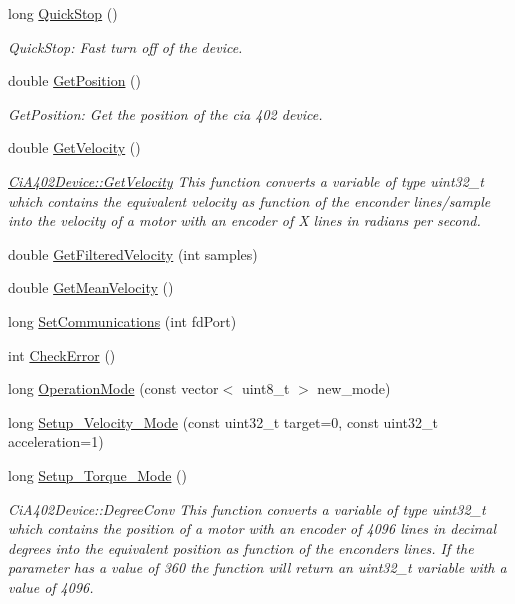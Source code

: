 \begin{DoxyCompactItemize}
long \hyperlink{classCiA402Device_a8573afbf420c29aa86cd215d74f4e4e3}{Quick\+Stop} ()
\begin{DoxyCompactList}\small\item\em Quick\+Stop\+: Fast turn off of the device. \end{DoxyCompactList}\item 
double \hyperlink{classCiA402Device_ac8d9e36e6f457565cac7d26d91e4a712}{Get\+Position} ()
\begin{DoxyCompactList}\small\item\em Get\+Position\+: Get the position of the cia 402 device. \end{DoxyCompactList}\item 
double \hyperlink{classCiA402Device_a54b43f6429da4c6c0241653355e81d36}{Get\+Velocity} ()
\begin{DoxyCompactList}\small\item\em \hyperlink{classCiA402Device_a54b43f6429da4c6c0241653355e81d36}{Ci\+A402\+Device\+::\+Get\+Velocity} This function converts a variable of type uint32\+\_\+t which contains the equivalent velocity as function of the enconder lines/sample into the velocity of a motor with an encoder of X lines in radians per second. \end{DoxyCompactList}\item 
double \hyperlink{classCiA402Device_a436b9e3ba2d14367f0bba8d0fe977e23}{Get\+Filtered\+Velocity} (int samples)
\item 
double \hyperlink{classCiA402Device_aa19636eb332e6b3bc8265ecc3498f197}{Get\+Mean\+Velocity} ()
\item 
long \hyperlink{classCiA402Device_abf511a7d44b62ac93ae18fe21f8d51c9}{Set\+Communications} (int fd\+Port)
\item 
int \hyperlink{classCiA402Device_af1ed15805579e85e514e7ccf4ff21e10}{Check\+Error} ()
\item 
long \hyperlink{classCiA402Device_a49f298cf0d4d2d68007b3cb396e93a17}{Operation\+Mode} (const vector$<$ uint8\+\_\+t $>$ new\+\_\+mode)
\item 
long \hyperlink{classCiA402Device_acd659c05abd1534881a0cec2326d4ba8}{Setup\+\_\+\+Velocity\+\_\+\+Mode} (const uint32\+\_\+t target=0, const uint32\+\_\+t acceleration=1)
\item 
long \hyperlink{classCiA402Device_a20475438205c26cd4bcc689ed9c7fe95}{Setup\+\_\+\+Torque\+\_\+\+Mode} ()
\begin{DoxyCompactList}\small\item\em Ci\+A402\+Device\+::\+Degree\+Conv This function converts a variable of type uint32\+\_\+t which contains the position of a motor with an encoder of 4096 lines in decimal degrees into the equivalent position as function of the enconders lines. If the parameter has a value of 360 the function will return an uint32\+\_\+t variable with a value of 4096. \end{DoxyCompactList}\item 

\end{DoxyCompactItemize}
